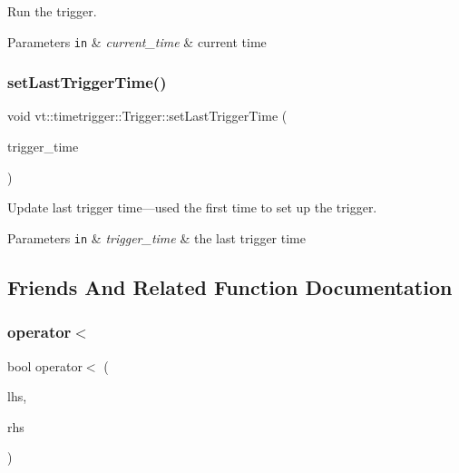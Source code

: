 Run the trigger. 


\begin{DoxyParams}[1]{Parameters}
\mbox{\tt in}  & {\em current\+\_\+time} & current time \\
\hline
\end{DoxyParams}
\mbox{\label{structvt_1_1timetrigger_1_1_trigger_aae694885195a12a0bd7274859bfaa0ba}} 
\subsubsection{\texorpdfstring{set\+Last\+Trigger\+Time()}{setLastTriggerTime()}}
{\footnotesize\ttfamily void vt\+::timetrigger\+::\+Trigger\+::set\+Last\+Trigger\+Time (\begin{DoxyParamCaption}\item[{\hyperlink{namespacevt_a876a9d0cd5a952859c72de8a46881442}{Time\+Type}}]{trigger\+\_\+time }\end{DoxyParamCaption})\hspace{0.3cm}{\ttfamily [inline]}}



Update last trigger time---used the first time to set up the trigger. 


\begin{DoxyParams}[1]{Parameters}
\mbox{\tt in}  & {\em trigger\+\_\+time} & the last trigger time \\
\hline
\end{DoxyParams}


\subsection{Friends And Related Function Documentation}
\mbox{\label{structvt_1_1timetrigger_1_1_trigger_a9e42ae58737ff5be162e315dd41b1ee2}} 
\subsubsection{\texorpdfstring{operator$<$}{operator<}}
{\footnotesize\ttfamily bool operator$<$ (\begin{DoxyParamCaption}\item[{\hyperlink{structvt_1_1timetrigger_1_1_trigger}{Trigger} const \&}]{lhs,  }\item[{\hyperlink{structvt_1_1timetrigger_1_1_trigger}{Trigger} const \&}]{rhs }\end{DoxyParamCaption})\hspace{0.3cm}{\ttfamily [friend]}}



